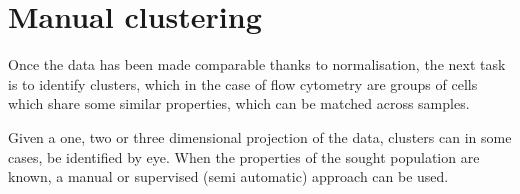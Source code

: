 
%

\section{Manual clustering}

Once the data has been made comparable thanks to normalisation, the next task is to identify clusters, which in the case of flow cytometry are groups of cells which share some similar properties,
which can be matched across samples.  

Given a one, two or three dimensional projection of the data, clusters can in some cases, be identified by eye.
When the properties of the sought population are known, a manual or supervised (semi automatic) approach can be used.

